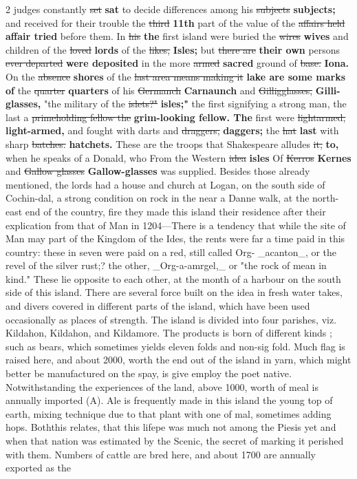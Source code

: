 \documentclass[10pt]{article}
\begin{document}
\begin{multicols}{2}
judges constantly \sout{set} \textbf{sat} to decide differences among his \sout{subjects} \textbf{subjects;} and received for their trouble the \sout{third} \textbf{11th} part of the value of the \sout{affairs held} \textbf{affair tried} before them. In \sout{his} \textbf{the} first island were buried the \sout{wires} \textbf{wives} and children of the \sout{loved} \textbf{lords} of the \sout{likes,} \textbf{Isles;} but \sout{there are} \textbf{their own} persons \sout{ever departed} \textbf{were deposited} in the more \sout{armed} \textbf{sacred} ground of \sout{base.} \textbf{Iona.} On the \sout{absence} \textbf{shores} of the \sout{last area means making it} \textbf{lake are some marks of} the \sout{quarter} \textbf{quarters} of his \sout{Germanch} \textbf{Carnaunch} and \sout{Gilligglasses,} \textbf{Gilli-glasses,} "the military of the \sout{islets?"} \textbf{isles;"} the first signifying a strong man, the last a \sout{primeholding fellow the} \textbf{grim-looking fellow. The} first were \sout{lightarmed,} \textbf{light-armed,} and fought with darts and \sout{draggers,} \textbf{daggers;} the \sout{hat} \textbf{last} with sharp \sout{batches.} \textbf{hatchets.} These are the troops that Shakespeare alludes \sout{it,} \textbf{to,} when he speaks of a Donald, who From the Western \sout{idea} \textbf{isles} Of \sout{Kerros} \textbf{Kernes} and \sout{Gallow glasses} \textbf{Gallow-glasses} was supplied. Besides those already mentioned, the lords had a house and church at Logan, on the south side of Cochin-dal, a strong condition on rock in the near a Danne walk, at the north-east end of the country, fire they made this island their residence after their explication from that of Man in 1204—There is a tendency that while the site of Man may part of the Kingdom of the Ides, the rents were far a time paid in this country: these in seven were paid on a red, still called Org- \_acanton\_, or the revel of the silver rust;? the other, \_Org-a-amrgel,\_ or "the rock of mean in kind." These lie opposite to each other, at the month of a harbour on the south side of this island. There are several force built on the idea in fresh water takes, and divers covered in different parts of the island, which have been used occasionally as places of strength. The island is divided into four parishes, viz. Kildahon, Kildahon, and Kildamore. The products is born of different kinds ; such as bears, which sometimes yields eleven folds and non-sig fold. Much flag is raised here, and about 2000, worth the end out of the island in yarn, which might better be manufactured on the spay, is give employ the poet native. Notwithstanding the experiences of the land, above 1000, worth of meal is annually imported (A). Ale is frequently made in this island the young top of earth, mixing technique due to that plant with one of mal, sometimes adding hops. Boththis relates, that this lifepe was much not among the Piesis yet and when that nation was estimated by the Scenic, the secret of marking it perished with them. Numbers of cattle are bred here, and about 1700 are annually exported as the
\end{multicols}
\end{document}
